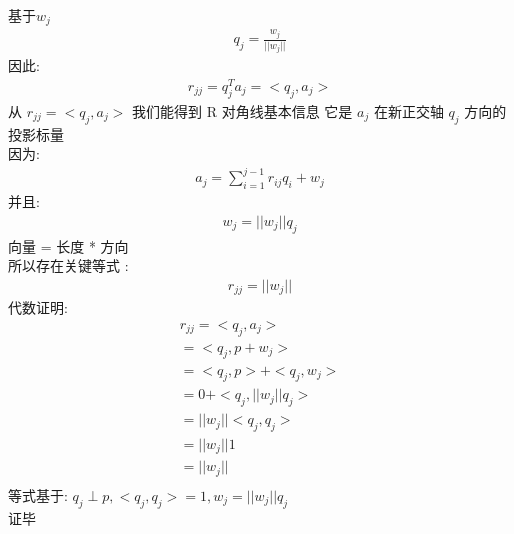 \documentclass[12pt]{article}
\begin{document}
\begin{flushleft}
    基于$w_{j}$ \\
    \begin{align}
        q_{j} = \frac{w_{j}}{||w_{j}||}
    \end{align}
    因此: \\
    \begin{align}
        r_{jj} = q_{j}^{T}a_{j}
        = <q_{j}, a_{j}>
    \end{align}
    从 $r_{jj} = <q_{j}, a_{j}>$ 我们能得到 R 对角线基本信息 它是 $a_{j}$ 在新正交轴 $q_{j}$ 方向的投影标量\\
    因为: \\
    \begin{align}
        a_{j} = \sum_{i = 1}^{j - 1}r_{ij}q_{i} + w_{j}
    \end{align}
    并且: \\
    \begin{align}
        w_{j} =  ||w_{j}||q_{j}
    \end{align}
    向量 = 长度 * 方向  \\
    所以存在关键等式 : \\
    \begin{align}
        r_{jj} = ||w_{j}||
    \end{align}
    代数证明: \\
    \begin{align}
        r_{jj} = <q_{j}, a_{j}>        \\
        = <q_{j}, p + w_{j}>           \\
        = <q_{j}, p> + <q_{j},w_{j}>   \\
        = 0  + <q_{j}, ||w_{j}||q_{j}> \\
        = ||w_{j}||<q_{j}, q_{j}>      \\
        = ||w_{j}|| 1                  \\
        = ||w_{j}||                    \\
    \end{align}
    等式基于: $q_{j} \perp p, <q_{j}, q_{j}> = 1, w_{j} =  ||w_{j}||q_{j}$ \\
    证毕


\end{flushleft}
\end{document}
